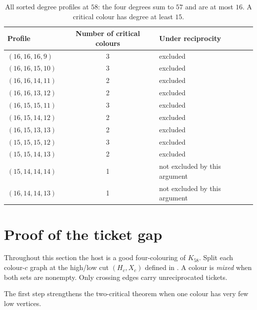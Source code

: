 \documentclass[11pt]{article}
\theoremstyle{definition}
\theoremstyle{remark}
\begin{document}
\begin{table}[htbp]
\centering
\caption{All sorted degree profiles at $58$: the four degrees sum to $57$ and
are at most $16$.  A critical colour has degree at least $15$.}
\label{tab:profile-arithmetic}
\begin{tabular}{lcl}
\toprule
Profile & Number of critical colours & Under reciprocity\\
\midrule
$(16,16,16,9)$  & 3 & excluded\\
$(16,16,15,10)$ & 3 & excluded\\
$(16,16,14,11)$ & 2 & excluded\\
$(16,16,13,12)$ & 2 & excluded\\
$(16,15,15,11)$ & 3 & excluded\\
$(16,15,14,12)$ & 2 & excluded\\
$(16,15,13,13)$ & 2 & excluded\\
$(15,15,15,12)$ & 3 & excluded\\
$(15,15,14,13)$ & 2 & excluded\\
$(15,14,14,14)$ & 1 & not excluded by this argument\\
$(16,14,14,13)$ & 1 & not excluded by this argument\\
\bottomrule
\end{tabular}
\end{table}

\section{Proof of the ticket gap}\label{sec:ticket-gap}

Throughout this section the host is a good four-colouring of $K_{58}$.  Split
each colour-$c$ graph at the high/low cut $(H_c,X_c)$ defined in
.  A colour is \emph{mixed} when both sets are nonempty.
Only crossing edges carry unreciprocated tickets.

The first step strengthens the two-critical theorem when one colour has very
few low vertices.
\end{document}
